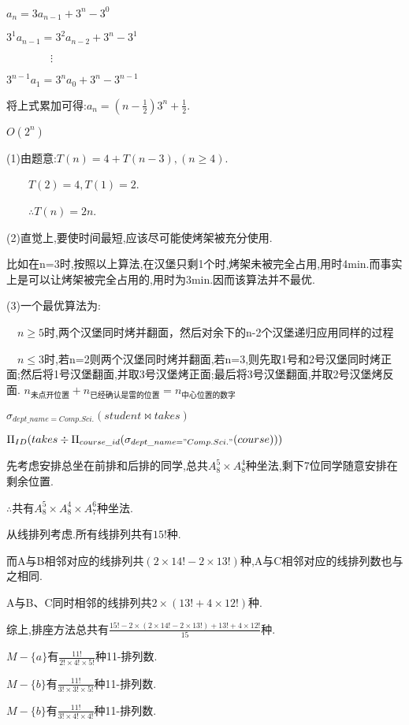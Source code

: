 \documentclass[a4paper]{ctexart}
\begin{document}
	$a_{n}=3a_{n-1}+3^n-3^0$\par
	$3^1a_{n-1}=3^2a_{n-2}+3^n-3^1$\par
	$\qquad\qquad\vdots$\par
	$3^{n-1}a_{1}=3^na_{0}+3^n-3^{n-1}$\par
	将上式累加可得:$a_{n}=(n-\frac{1}{2})3^n+\frac{1}{2}$.\par
	$O(2^n)$\par
	(1)由题意:$T(n)=4+T(n-3),(n\geq4)$.\par
	$\qquad{}T(2)=4,T(1)=2$.\par
	$\qquad{}\therefore{}T(n)=2n$.\par
	(2)直觉上,要使时间最短,应该尽可能使烤架被充分使用.\par
	比如在n=3时,按照以上算法,在汉堡只剩1个时,烤架未被完全占用,用时4min.而事实上是可以让烤架被完全占用的,用时为3min.因而该算法并不最优.\par
	(3)一个最优算法为:\par
	$\quad{}n\geq{}5$时,两个汉堡同时烤并翻面，然后对余下的n-2个汉堡递归应用同样的过程\par
	$\quad{}n\leq{}3$时,若n=2则两个汉堡同时烤并翻面,若n=3,则先取1号和2号汉堡同时烤正面;然后将1号汉堡翻面,并取3号汉堡烤正面;最后将3号汉堡翻面,并取2号汉堡烤反面.
	$n_{未点开位置}+n_{已经确认是雷的位置}=n_{中心位置的数字}$\par
	$\sigma_{dept\_name=Comp.Sci.}(student\Join{}takes)$\par
	$\Pi_{ID}(takes\div{}\Pi_{course\_id}(\sigma_{dept\_name="Comp.Sci."}(course)))$\par
	先考虑安排总坐在前排和后排的同学,总共$A_{8}^5\times{}A_{8}^4$种坐法,剩下7位同学随意安排在剩余位置.\par
	$\therefore$共有$A_{8}^5\times{}A_{8}^4\times{}A_{7}^6$种坐法.\par
	从线排列考虑.所有线排列共有$15!$种.\par
	而A与B相邻对应的线排列共$(2\times{}14!-2\times{}13!)$种,A与C相邻对应的线排列数也与之相同.\par
	A与B、C同时相邻的线排列共$2\times{}(13!+4\times{}12!)$种.\par
	综上,排座方法总共有$\frac{15!-2\times{}(2\times{}14!-2\times{}13!)+13!+4\times{}12!}{15}$种.\par
	$M-\{a\}$有$\frac{11!}{2!\times{}4!\times{}5!}$种11-排列数.\par	
	$M-\{b\}$有$\frac{11!}{3!\times{}3!\times{}5!}$种11-排列数.\par	
	$M-\{b\}$有$\frac{11!}{3!\times{}4!\times{}4!}$种11-排列数.\par	
\end{document}
